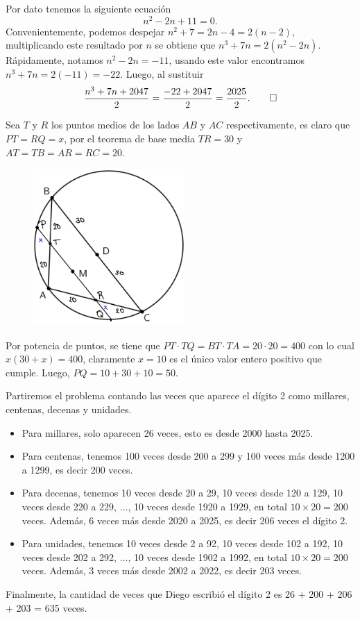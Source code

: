 \begin{solution}[(Problema 3)]
    Por dato tenemos la siguiente ecuación
    \[
        n^2 - 2n + 11 = 0.
    \]
    Convenientemente, podemos despejar $n^2 + 7 = 2n - 4 = 2(n - 2)$, multiplicando este resultado por $n$ se obtiene que
    $n^3 + 7n = 2(n^2 - 2n)$.
    Rápidamente, notamos $n^2 - 2n = -11$, usando este valor encontramos $n^3 + 7n = 2(-11) = -22$.
    Luego, al sustituir
    \[
        \frac{n^3 + 7n + 2047}{2} = \frac{-22 + 2047}{2} = \frac{2025}{2}. \qedhere
    \]
\end{solution}

\begin{solution}[(Problema 4)]
    Sea $T$ y $R$ los puntos medios de los lados $AB$ y $AC$ respectivamente, es claro que $PT = RQ = x$, por el teorema de base media
    $TR = 30$ y $AT = TB = AR = RC = 20$.
    \begin{figure}[H]
        \centering
        \includegraphics[width=5.8cm]{content/figure3}
    \end{figure}
    Por potencia de puntos, se tiene que $PT \cdot TQ = BT \cdot TA = 20 \cdot 20 = 400$ con lo cual $x(30 + x) = 400$,
    claramente $x = 10$ es el único valor entero positivo que cumple.
    Luego, $PQ = 10 + 30 + 10 = 50$.
\end{solution}

\begin{solution}[(Problema 5)]
    Partiremos el problema contando las veces que aparece el dígito 2 como millares, centenas, decenas y unidades.
    \begin{itemize}
        \item Para millares, solo aparecen 26 veces, esto es desde 2000 hasta 2025.
        \item Para centenas, tenemos 100 veces desde 200 a 299 y 100 veces más desde 1200 a 1299, es decir 200 veces.
        \item Para decenas, tenemos 10 veces desde 20 a 29, 10 veces desde 120 a 129, 10 veces desde 220 a 229, $\ldots$, 10 veces desde 1920 a 1929, en total $10\times 20 = 200$ veces.
        Además, 6 veces más desde 2020 a 2025, es decir 206 veces el dígito 2.
        \item Para unidades, tenemos 10 veces desde 2 a 92, 10 veces desde 102 a 192, 10 veces desde 202 a 292, $\ldots$, 10 veces desde 1902 a 1992, en total $10\times 20 = 200$ veces.
        Además, 3 veces más desde 2002 a 2022, es decir 203 veces.
    \end{itemize}
    Finalmente, la cantidad de veces que Diego escribió el dígito 2 es 26 + 200 + 206 + 203 = 635 veces.
\end{solution}

